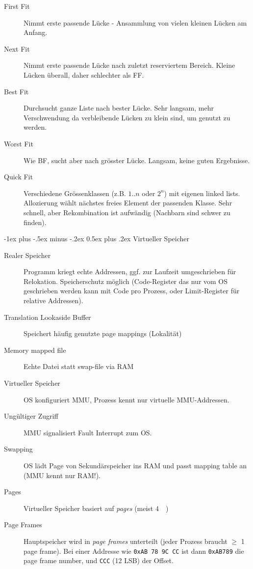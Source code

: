 \documentclass[10pt,landscape,a4paper]{article}
\makeatletter
\renewcommand{\section}{\@startsection{section}{1}{0mm}%
                                {-1ex plus -.5ex minus -.2ex}%
                                {0.5ex plus .2ex}%
                                {\normalfont\large\bfseries}}
\makeatother
\begin{document}
\begin{multicols*}{3}
\begin{description}
  \item[First Fit] Nimmt erste passende Lücke - Ansammlung von vielen
    kleinen Lücken am Anfang.
  \item[Next Fit] Nimmt erste passende Lücke nach zuletzt reserviertem Bereich.
    Kleine Lücken überall, daher schlechter als FF.
  \item[Best Fit] Durchsucht ganze Liste nach bester Lücke. Sehr langsam, mehr
    Verschwendung da verbleibende Lücken zu klein sind, um genutzt zu werden.
  \item[Worst Fit] Wie BF, sucht aber nach grösster Lücke. Langsam, keine guten Ergebnisse.
  \item[Quick Fit] Verschiedene Grössenklassen (z.B. $1..n$ oder $2^n$) mit
    eigenen linked lists. Allozierung wählt nächstes freies Element der
    passenden Klasse. Sehr schnell, aber Rekombination ist aufwändig (Nachbarn
    sind schwer zu finden).
\end{description}

\section{Virtueller Speicher}

\begin{description}
  \item[Realer Speicher] Programm kriegt echte Addressen, ggf. zur Laufzeit
    umgeschrieben für Relokation. Speicherschutz möglich (Code-Register das nur
    vom OS geschrieben werden kann mit Code pro Prozess, oder Limit-Register für
    relative Addressen).
  \item[Translation Lookaside Buffer] Speichert häufig genutzte page mappings (Lokalität)
  \item[Memory mapped file] Echte Datei statt swap-file via RAM
  \item[Virtueller Speicher]  OS konfiguriert MMU, Prozess kennt nur virtuelle MMU-Addressen.
  \item[Ungültiger Zugriff] MMU signalisiert Fault Interrupt zum OS.
  \item[Swapping] OS lädt Page von Sekundärspeicher ins RAM und passt mapping
    table an (MMU kennt nur RAM!).
  \item[Pages] Virtueller Speicher basiert auf \emph{pages} (meist \SI{4}{\kilo\byte})
  \item[Page Frames] Hauptspeicher wird in \emph{page frames}
unterteilt (jeder Prozess braucht $\geq$ 1 page frame). Bei einer Addresse wie
\verb|0xAB 78 9C CC| ist dann \verb|0xAB789|
die page frame number, und \verb|CCC| (12 LSB) der Offset.
\end{description}


\end{multicols*}
\end{document}
